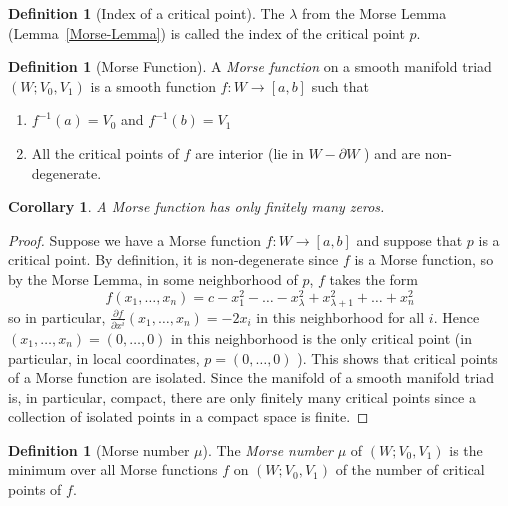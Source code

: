 \documentclass[reqno]{amsart}
\newtheorem{corollary}[theorem]{Corollary}
\theoremstyle{definition}
\newtheorem{definition}[theorem]{Definition}
\theoremstyle{remark}
\begin{document}
   \begin{definition}[Index of a critical point]
       The $\lambda$ from the Morse Lemma (Lemma~\ref{Morse-Lemma})
       is called the index of the critical point $p$.
   \end{definition} 

   \begin{definition}[Morse Function]
       A \textit{Morse function} on a smooth
       manifold triad
       $\left( W; V_0,V_1 \right) $ is a smooth
       function $f \colon W \to \left[ a,b \right] $ 
       such that
       \begin{enumerate}
           \item $f^{-1}(a) = V_0$ and $f^{-1}(b) = V_1$ 
           \item All the critical points of $f$ are
               interior (lie in $W - \partial W$ ) and
               are non-degenerate.
       \end{enumerate}
   \end{definition}

   \begin{corollary}
       A Morse function has only finitely many zeros.
   \end{corollary}

   \begin{proof}
       Suppose we have a Morse function
       $f \colon W \to \left[ a,b \right] $ and
       suppose that  $p$ is
       a critical point. By definition, it is non-degenerate
       since $f$ is a Morse function, so by the
       Morse Lemma, in some neighborhood of
        $p$, $f$ takes the form
       \[
       f\left( x_1, \ldots, x_n \right) 
       = c - x_1^2 - \ldots - x_{\lambda}^2 +
       x_{\lambda+1}^2 + \ldots+ x_{n}^2
       \] 
       so in particular,
       $\frac{\partial f}{\partial x^{i}} 
       \left( x_1,\ldots,x_n \right) 
       = -2x_i$ in this neighborhood for all $i$.
       Hence $\left( x_1, \ldots, x_n \right) 
       = \left( 0,\ldots,0 \right) $ in this neighborhood
       is the only critical point (in particular,
       in local coordinates, $p = \left( 0,\ldots,0 \right) $ ).
       This shows that critical points of a Morse
       function are isolated. Since
       the manifold of a smooth manifold triad is, in particular,
       compact, there are only finitely many critical points
       since a collection of isolated points in a compact
       space is finite.
   \end{proof}

   \begin{definition}[Morse number $\mu$]
       The \textit{Morse number} $\mu$ of $\left( W;
       V_0, V_1\right) $ is the minimum over all
       Morse functions $f$ on $\left( W;V_0,V_1 \right)$
       of the number of critical
       points of $f$.
   \end{definition}
\end{document}
